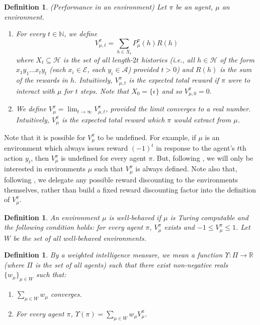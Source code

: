 \documentclass[twoside]{article}
\newtheorem{definition}[theorem]{Definition}
\begin{document}
\begin{definition}
\label{performancedefn}
    (Performance in an environment)
    Let $\pi$ be an agent, $\mu$ an environment.
    \begin{enumerate}
    \item
        For every $t\in\mathbb N$,
        we define
        \[
            V^\pi_{\mu,t}=\sum_{h\in X_t}P^\pi_\mu(h)R(h)
        \]
        where $X_t\subseteq\mathcal H$ is the set of all
        length-$2t$ histories (i.e., all $h\in\mathcal H$ of the form
        $x_1y_1\ldots x_ty_t$ (each $x_i\in\mathcal E$, each $y_i\in\mathcal A$)
        provided $t>0$) and $R(h)$ is the sum of the rewards in $h$.
        Intuitively, $V^\pi_{\mu,t}$ is the expected total reward
        if $\pi$ were to interact with $\mu$ for $t$ steps.
        Note that $X_0=\{\epsilon\}$ and so $V^\pi_{\mu,0}=0$.
    \item
        We define $V^\pi_\mu=\lim_{t\to\infty}V^\pi_{\mu,t}$,
        provided the limit converges to a real number.
        Intuitively, $V^\pi_\mu$ is the expected total reward which $\pi$ would extract
        from $\mu$.
    \end{enumerate}
\end{definition}

Note that it is possible for $V^\pi_\mu$ to be undefined.
For example, if $\mu$ is an environment which always issues
reward $(-1)^t$ in response to the agent's $t$th action $y_t$,
then $V^\pi_\mu$ is undefined for every agent $\pi$.
But, following \cite{legg2007universal}, we will only be interested in
environments $\mu$ such that $V^\pi_\mu$
is always defined. Note also that, following \cite{legg2007universal},
we delegate any possible reward discounting to the environments themselves,
rather than build a fixed reward discounting factor into the definition
of $V^\pi_\mu$.

\begin{definition}
\label{wellbehaveddefn}
    An environment $\mu$ is \emph{well-behaved} if $\mu$ is Turing
    computable and the following
    condition holds: for every agent $\pi$, $V^\pi_\mu$ exists and
    $-1\leq V^\pi_\mu\leq 1$. Let $W$ be the set of all well-behaved environments.
\end{definition}

\begin{definition}
\label{performanceaveragerdefn}
    By a \emph{weighted intelligence measure}, we mean a function
    $\Upsilon:\Pi\to \mathbb R$ (where $\Pi$ is the set of all agents)
    such that there exist non-negative reals $\{w_\mu\}_{\mu\in W}$ such that:
    \begin{enumerate}
        \item
        $\sum_{\mu\in W}w_\mu$ converges.
        \item
        For every agent $\pi$, $\Upsilon(\pi)=\sum_{\mu\in W}w_\mu V^\pi_\mu$.
    \end{enumerate}
\end{definition}
\end{document}
